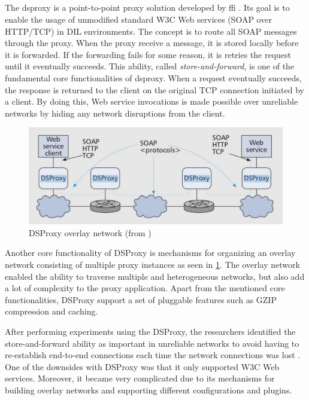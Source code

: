 \subsection{}

The \gls{dsproxy} is a point-to-point proxy solution developed by \gls{ffi}
\cite{dsproxy-ffi}\cite{ieee-dsproxy}. Its goal is to enable the usage of
unmodified standard W3C Web services (SOAP over HTTP/TCP) in DIL environments.
The concept is to route all SOAP messages through the proxy. When the proxy
receive a message, it is stored locally before it is forwarded. If the
forwarding fails for some reason, it is retries the request until it eventually
succeeds. This ability, called \textit{store-and-forward}, is one of the
fundamental core functionalities of \gls{dsproxy}. When a request eventually
succeeds, the response is returned to the client on the original TCP connection
initiated by a client. By doing this, Web service invocations is made possible
over unreliable networks by hiding any network disruptions from the client.

\begin{figure}[h]
\includegraphics[scale=0.35]{images/dsproxy.pdf}
\caption{DSProxy overlay network (from \cite{ieee-dsproxy} )}
\label{figure:dsproxy}
\end{figure}

Another core functionality of DSProxy is mechanisms for organizing an overlay
network consisting of multiple proxy instances as seen in \cref{figure:dsproxy}.
The overlay network enabled the ability to traverse multiple and heterogeneous
networks, but also add a lot of complexity to the proxy application. Apart from
the mentioned core functionalities, DSProxy support a set of pluggable
features such as GZIP compression and caching.

After performing experiments using the DSProxy, the researchers identified the
store-and-forward ability as important in unreliable networks to avoid having to
re-establish end-to-end connections each time the network connections was lost
\cite{dsproxy-ffi}. One of the downsides with DSProxy was that it only supported
W3C Web services. Moreover, it became very complicated due to its mechanisms for
building overlay networks and supporting different configurations and plugins.

